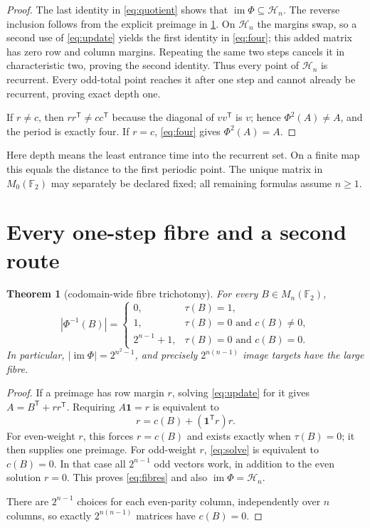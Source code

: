 \documentclass[10pt,a4paper]{amsart}
\newtheorem{theorem}{Theorem}[section]
\theoremstyle{definition}
\theoremstyle{remark}
\newcommand{\F}{\mathbb F_2}
\newcommand{\one}{\mathbf 1}
\newcommand{\im}{\operatorname{im}}
\begin{document}
\begin{proof}
The last identity in \eqref{eq:quotient} shows that $\im\Phi\subseteq
\mathcal H_n$.  The reverse inclusion follows from the explicit preimage in
\cref{thm:fibres}.  On $\mathcal H_n$ the margins swap, so a second use of
\eqref{eq:update} yields the first identity in \eqref{eq:four}; this added
matrix has zero row and column margins.  Repeating the same two steps cancels
it in characteristic two, proving the second identity.  Thus every point of
$\mathcal H_n$ is recurrent.  Every odd-total point reaches it after one step
and cannot already be recurrent, proving exact depth one.

If $r\ne c$, then $rr^{\mathsf T}\ne cc^{\mathsf T}$ because the diagonal
of $vv^{\mathsf T}$ is $v$; hence $\Phi^2(A)\ne A$, and the period is exactly
four.  If $r=c$, \eqref{eq:four} gives $\Phi^2(A)=A$.
\end{proof}

Here depth means the least entrance time into the recurrent set.  On a finite
map this equals the distance to the first periodic point.  The unique matrix
in $M_0(\F)$ may separately be declared fixed; all remaining formulas assume
$n\ge1$.

\section{Every one-step fibre and a second route}

\begin{theorem}[codomain-wide fibre trichotomy]\label{thm:fibres}
For every $B\in M_n(\F)$,
\begin{equation}
 |\Phi^{-1}(B)|=
 \begin{cases}
 0,&\tau(B)=1,\\
 1,&\tau(B)=0\text{ and }c(B)\ne0,\\
 2^{n-1}+1,&\tau(B)=0\text{ and }c(B)=0.
 \end{cases}                                           \label{eq:fibres}
\end{equation}
In particular, $|\im\Phi|=2^{n^2-1}$, and precisely $2^{n(n-1)}$ image
targets have the large fibre.
\end{theorem}

\begin{proof}
If a preimage has row margin $r$, solving \eqref{eq:update} for it gives
$A=B^{\mathsf T}+rr^{\mathsf T}$.  Requiring $A\one=r$ is equivalent to
\begin{equation}
 r=c(B)+(\one^{\mathsf T}r)r.                           \label{eq:solve}
\end{equation}
For even-weight $r$, this forces $r=c(B)$ and exists exactly when
$\tau(B)=0$; it then supplies one preimage.  For odd-weight $r$,
\eqref{eq:solve} is equivalent to $c(B)=0$.  In that case all $2^{n-1}$
odd vectors work, in addition to the even solution $r=0$.  This proves
\eqref{eq:fibres} and also $\im\Phi=\mathcal H_n$.

There are $2^{n-1}$ choices for each even-parity column, independently over
$n$ columns, so exactly $2^{n(n-1)}$ matrices have $c(B)=0$.
\end{proof}
\end{document}
